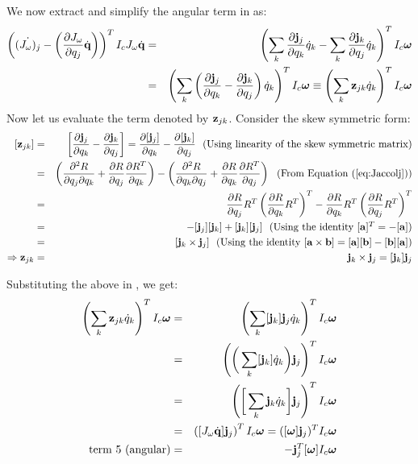 We now extract and simplify the angular term in  as:
\begin{eqnarray}
\label{eq:term5_ang}
\nonumber
\left( \dot{(J_\omega)_j}  - \left(\frac{\partial J_\omega}{\partial q_j}\dot{\mathbf{q}}\right) \right )^T I_c J_\omega \dot{\mathbf{q}} & = & \left( \sum_k \frac{\partial \mathbf{j}_j}{\partial q_k}\dot{q}_k -  \sum_k \frac{\partial \mathbf{j}_k}{\partial q_j} \dot{q}_k \right )^T I_c \bm{\omega}\\
& = & \left( \sum_k \left ( \frac{\partial \mathbf{j}_j}{\partial q_k}  -  \frac{\partial \mathbf{j}_k}{\partial q_j}\right ) \dot{q}_k \right )^T I_c \bm{\omega} \equiv \left ( \sum_k \mathbf{z}_{jk} \dot{q}_k \right )^T I_c\bm{\omega} 
\end{eqnarray}
Now let us evaluate the term denoted by $\mathbf{z}_{jk}$. Consider the skew symmetric form:
\begin{eqnarray}
\nonumber
[\vc{z}_{jk}] & = & \left [ \frac{\partial \vc{j}_j}{\partial q_k}  -  \frac{\partial \vc{j}_k}{\partial q_j} \right ] = \frac{\partial [\vc{j}_j]}{\partial q_k}  -  \frac{\partial [\vc{j}_k]}{\partial q_j} \mbox{\ \ (Using linearity of the skew symmetric matrix)}\\
\nonumber
& = & \left ( \frac{\partial^2 R}{\partial q_j \partial q_k} + \frac{\partial R}{\partial q_j} \frac{\partial R^T}{\partial q_k} \right ) - \left ( \frac{\partial^2 R}{\partial q_k \partial q_j} + \frac{\partial R}{\partial q_k} \frac{\partial R^T}{\partial q_j} \right ) \mbox{\ \ (From \eqnref{Jaccolj})}\\
\nonumber
& = & \frac{\partial R}{\partial q_j}R^T \left( \frac{\partial R}{\partial q_k}R^T\right)^T - \frac{\partial R}{\partial q_k}R^T \left( \frac{\partial R}{\partial q_j}R^T\right)^T\\
\nonumber
& = & -[\vc{j}_j][\vc{j}_k] + [\vc{j}_k][\vc{j}_j] \mbox{\ \ (Using the identity $[\vc{a}]^T = -[\vc{a}]$)}\\
\nonumber
& = & [\vc{j}_k\times \vc{j}_j] \mbox{\ \ (Using the identity $[\vc{a}\times \vc{b}] = [\vc{a}][\vc{b}] - [\vc{b}][\vc{a}]$)}\\
\Rightarrow \vc{z}_{jk} & = & \vc{j}_k\times \vc{j}_j = [\vc{j}_k] \vc{j}_j
\end{eqnarray}

Substituting the above in , we get:
\begin{eqnarray}
\label{eq:term5_ang_final}
\nonumber
\left ( \sum_k \mathbf{z}_{jk} \dot{q}_k \right )^T I_c\bm{\omega}  & = & \left ( \sum_k [\mathbf{j}_k] \mathbf{j}_j \dot{q}_k \right )^T I_c\bm{\omega} \\
\nonumber
& = & \left ( \bigg ( \sum_k [\mathbf{j}_k]\dot{q}_k \bigg ) \mathbf{j}_j \right )^T I_c\bm{\omega}\\
\nonumber
& = & \left ( \bigg [ \sum_k \mathbf{j}_k \dot{q}_k \bigg ] \mathbf{j}_j \right )^T I_c\bm{\omega} \\
\nonumber
& = & \left ( [ J_\omega \dot{\mathbf{q}} ] \mathbf{j}_j \right )^T I_c\bm{\omega} = ([\bm{\omega}]\mathbf{j}_j)^TI_c\bm{\omega}\\
\mbox{term 5 (angular)} & = & -\mathbf{j}_j^T [\bm{\omega}] I_c\bm{\omega}
\end{eqnarray} 

